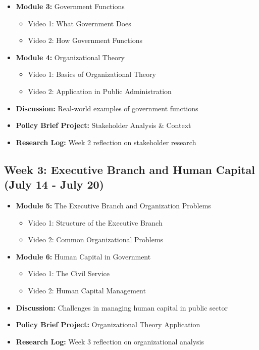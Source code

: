 \documentclass[11pt, letterpaper]{article}
\begin{document}
\begin{itemize}
    \item \textbf{Module 3:} Government Functions
        \begin{itemize}
            \item Video 1: What Government Does
            \item Video 2: How Government Functions
        \end{itemize}
    \item \textbf{Module 4:} Organizational Theory
        \begin{itemize}
            \item Video 1: Basics of Organizational Theory
            \item Video 2: Application in Public Administration
        \end{itemize}
    \item \textbf{Discussion:} Real-world examples of government functions
    \item \textbf{Policy Brief Project:} Stakeholder Analysis \& Context
    \item \textbf{Research Log:} Week 2 reflection on stakeholder research
\end{itemize}

\subsection*{Week 3: Executive Branch and Human Capital (July 14 - July 20)}

\begin{itemize}
    \item \textbf{Module 5:} The Executive Branch and Organization Problems
        \begin{itemize}
            \item Video 1: Structure of the Executive Branch
            \item Video 2: Common Organizational Problems
        \end{itemize}
    \item \textbf{Module 6:} Human Capital in Government
        \begin{itemize}
            \item Video 1: The Civil Service
            \item Video 2: Human Capital Management
        \end{itemize}
    \item \textbf{Discussion:} Challenges in managing human capital in public sector
    \item \textbf{Policy Brief Project:} Organizational Theory Application
    \item \textbf{Research Log:} Week 3 reflection on organizational analysis
\end{itemize}
\end{document}
